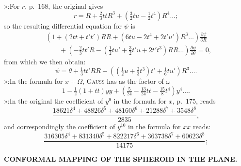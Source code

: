 {\noindent »\quad [17]:\quad For \(r\), p.\ 168, the original gives
\[
r=R+\tfrac23ttR^3+(\tfrac32tu-\tfrac12t^4)R^4\ldots;
\]
\noindent so the resulting differential equation for \(\psi\) is
\[
\begin{aligned}
&\left(1+(2tt+t't')RR+(6tu-2t^4+2t'u')R^3\ldots\right)
 \frac{\partial\psi}{\partial R}\\
&\qquad+\left(-\tfrac23tt'R-(\tfrac12tu'+\tfrac32t'u+2t't^3)RR\ldots\right)
 \frac{\partial\psi}{\partial\theta}=0,
\end{aligned}
\]
\noindent from which we then obtain:
\[
\psi=\theta+\tfrac13tt'RR+\left((\tfrac12u+\tfrac23t^3)t'+\tfrac16tu'\right)R^3\ldots.
\]
\noindent »\quad [20]:\quad In the formula for \(x+\Omega\), \textsc{Gauss} has as the factor of \(\omega\)
\[
1-\tfrac12(1+tt)yy+(\tfrac5{24}-\tfrac{13}{24}tt-\tfrac{15}8t^4)y^4\ldots.
\]
\noindent »\quad [23]:\quad In the original the coefficient of \(y^9\) in the formula for \(x\), p.\ 175, reads
\[
\frac{18621\delta^4+48826\delta^5+48160\delta^6+21288\delta^7+3548\delta^8}{2835},
\]
\noindent and correspondingly the coefficient of \(y^{10}\) in the formula for \(xx\) reads:
\[
\frac{316305\delta^4+831340\delta^5+822217\delta^6+363738\delta^7+60623\delta^8}{14175};
\]
\par}

\par\clearpage
\noindent\null\hfill{\small\textbf{CONFORMAL MAPPING OF THE SPHEROID IN THE PLANE.}}\hfill{}\par\medskip


